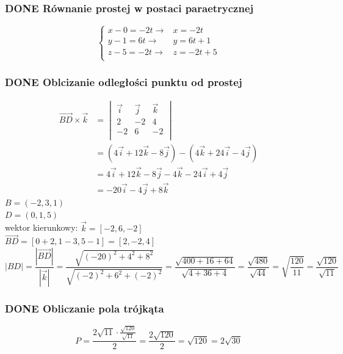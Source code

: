 \documentclass[11pt]{article}
\begin{document}
\subsubsection{{\bfseries\sffamily DONE} Równanie prostej w postaci paraetrycznej}
\label{sec:orgccc83c7}
\[\begin{cases}
x-0 = -2t \to & x = -2t\\
y - 1 = 6t \to & y = 6t +1\\
z -5 = -2t \to & z = -2t + 5\\
\end{cases}\]
\subsubsection{{\bfseries\sffamily DONE} Oblcizanie odległości punktu od prostej}
\label{sec:org6c2bc4c}
\begin{align*}
  \overrightarrow{BD} \times \vec{k}
  &= \begin{vmatrix}
       \vec{i} & \vec{j} & \vec{k}\\
       2 & -2 & 4\\
       -2 & 6 & -2\\
     \end{vmatrix}
  \\
  &= (4\vec{i} + 12\vec{k} - 8 \vec{j}) - (4 \vec{k} + 24 \vec{i} - 4 \vec{j})
  \\
  &= 4\vec{i} + 12\vec{k} - 8 \vec{j} - 4 \vec{k} - 24 \vec{i} + 4 \vec{j}
  \\
  &= -20\vec{i} - 4\vec{j} + 8 \vec{k}
\end{align*}
\(B=(-2,3,1)\)
\\\empty
\(D=(0, 1, 5)\)
\\\empty
wektor kierunkowy: \(\vec{k} = [-2, 6, -2]\)
\\\empty
\(\overrightarrow{BD} = [0 + 2 , 1 - 3 ,5 -1] = [2, -2, 4]\)
\\\empty
$$|BD| = \frac{|\overrightarrow{BD}|}{|\vec{k}|}
= \frac{\sqrt{(-20)^{2} + 4^{2} + 8^{2}}}
{\sqrt{(-2)^{2} + 6^{2} + (-2)^{2}} }
= \frac{\sqrt{400 + 16 + 64}}{\sqrt{4 + 36 + 4}}
= \frac{\sqrt{480}}{\sqrt{44}}
= \sqrt{\frac{120}{11}}
= \frac{\sqrt{120}}{\sqrt{11}}$$
\subsubsection{{\bfseries\sffamily DONE} Obliczanie pola trójkąta}
\label{sec:org58a3756}
$$P = \frac{ 2\sqrt{11} \cdot\frac{ \sqrt{120} }{\sqrt{11}} }
{2}
= \frac{2\sqrt{120}}{2}
= \sqrt{120}
= 2\sqrt{30}$$
\end{document}
